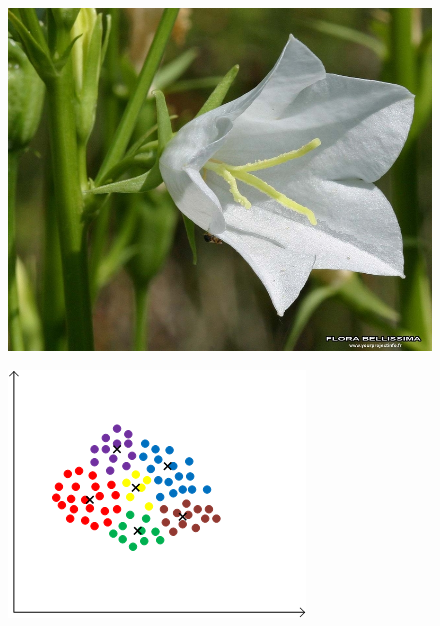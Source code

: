 \documentclass[xcolor=table]{beamer}
\begin{document}
\begin{frame}
\begin{figure}[htbp]
\begin{minipage}[c]{.4\linewidth}
\begin{center}
\includegraphics[scale=0.10]{87.jpg}
\label{fig:image4}
\end{center}
\end{minipage}
\hfill
\begin{minipage}[c]{.5\linewidth}
\begin{center}
\includegraphics[scale=0.35]{kmeans_img_1.png}
\label{fig:image5}
\end{center}
\end{minipage}
\end{figure}



\end{frame}
\end{document}

